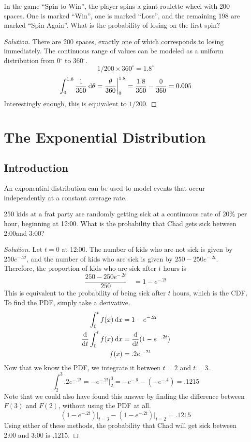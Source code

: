 \documentclass[11pt,leqno,letterpaper]{article}
\begin{document}
\begin{mdframed}
\begin{problem}
In the game ``Spin to Win'', the player spins a giant roulette wheel
with 200 spaces. One is marked ``Win'', one is marked ``Lose'',
and the remaining 198 are marked ``Spin Again''.
What is the probability of losing on the first spin?
\begin{proof}[Solution]
There are 200 spaces,
exactly one of which corresponds to losing immediately.
The continuous range of values can be modeled as
a uniform distribution from 0$^\circ$ to 360$^\circ$.
\[
1/200 \times 360^\circ = 1.8^\circ
\]
\[
\int_0^{1.8} \frac{1}{360} \:\mathrm{d}\theta
= \frac{\theta}{360} \bigg|_0^{1.8} 
= \frac{1.8}{360} - \frac{0}{360} = 0.005
\]
Interestingly enough, this is equivalent to $1/200$.
\end{proof}
\end{problem}
\end{mdframed}

\section{The Exponential Distribution}
\subsection{Introduction}
An exponential distribution can be used to model events that occur
independently at a constant average rate.

\begin{mdframed}
\begin{problem}
250 kids at a frat party are randomly getting sick at a continuous
rate of 20\% per hour, beginning at 12:00\AM .
What is the probability that Chad gets sick between 2:00\AM{ }and 3:00\AM ?
\begin{proof}[Solution]
Let $t=0$ at 12:00\AM .
The number of kids who are not sick is given by $250e^{-.2t}$,
and the number of kids who are sick is given by
$250 - 250e^{-.2t}$.
Therefore, the proportion of kids who are sick after $t$ hours is
\[
\frac{250 - 250e^{-.2t}}{250} \quad = 1 - e^{-.2t}
\]
This is equivalent to the probability of being sick after $t$ hours,
which is the CDF. To find the PDF, simply take a derivative.
\begin{align*}
\int_0^t f(x) \:\mathrm{d}x &= 1 - e^{-.2t}\\
\dfrac{\mathrm{d}}{\mathrm{d}t} \int_0^t f(x) \:\mathrm{d}x &= \dfrac{\mathrm{d}}{\mathrm{d}t} (1 - e^{-.2t})\\
f(x) &= .2e^{-.2t}
\end{align*}
Now that we know the PDF, we integrate it between $t=2$ and $t=3$.
\[
\int_2^3 .2e^{-.2t} = -e^{-.2t}\Big|_2^3 = -e^{-.6} - (-e^{-.4})
= .1215
\]
Note that we could also have found this answer by
finding the difference between $F(3)$ and $F(2)$,
without using the PDF at all.
\[
\left(1 - e^{-.2t}\right)\Big|_{t=3} -
\left(1 - e^{-.2t}\right)\Big|_{t=2} = .1215
\]
Using either of these methods, the probability that Chad will get sick
between 2:00\AM{} and 3:00\AM{} is $.1215$.
\end{proof}
\end{problem}
\end{mdframed}
\end{document}

